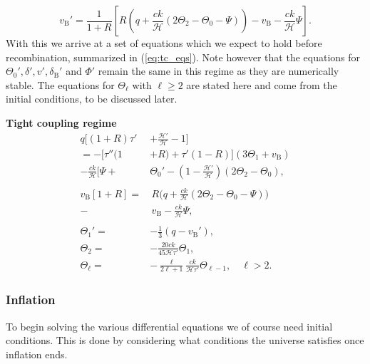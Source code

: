 \documentclass[%
reprint,
 amsmath,amssymb,
 aps,
]{revtex4-2}
\newcommand{\Hp}{\mathcal{H}}
\begin{document}
\[v_\text{B}'=\frac{1}{1+R}\left[R\left(q+\frac{ck}{\Hp}\left(2\Theta_2-\Theta_0-\Psi\right)\right)-v_\text{B}-\frac{ck}{\Hp}\Psi\right].\]
With this we arrive at a set of equations which we expect to hold before recombination, summarized in (\ref{eq:tc_eqs}). Note however that the equations for $\Theta_0',\delta',v',\delta_\text{B}'$ and $\Phi'$ remain the same in this regime as they are numerically stable. The equations for $\Theta_\ell$ with $\ell\geq2$ are stated here and come from the initial conditions, to be discussed later.
\begin{tcolorbox}[
	width=\linewidth,
	colback=black!3!white,
	]
	\textbf{Tight coupling regime}
	\begin{subequations}\label{eq:tc_eqs}
		\begin{align}
			q\biggl[(1+R)\tau'&+\frac{\Hp'}{\Hp}-1\biggr]\nonumber\\
			=-\bigl[\tau''(1&+R)+\tau'(1-R)\bigr](3\Theta_1+v_\text{B})\nonumber\\
			-\frac{ck}{\Hp}\biggl[\Psi+&\Theta_0'-\left(1-\frac{\Hp'}{\Hp}\right)(2\Theta_2-\Theta_0),\\
			\nonumber\\
			v_\text{B}[1+R]=&\,R\biggl(q+\frac{ck}{\Hp}\left(2\Theta_2-\Theta_0-\Psi\right)\biggr)\nonumber\\
			-&\,v_\text{B}-\frac{ck}{\Hp}\Psi,\\
			\nonumber\\
			\Theta_1'=&-\frac{1}{3}(q-v_\text{B}'),\\
			\Theta_2=&-\frac{20ck}{45\Hp\tau'}\Theta_1,\\
			\Theta_\ell=&-\frac{\ell}{2\ell+1}\frac{ck}{\Hp\tau'}\Theta_{\ell-1},\quad \ell>2.
		\end{align}
	\end{subequations}
\end{tcolorbox}



\subsubsection{Inflation}
To begin solving the various differential equations we of course need initial conditions. This is done by considering what conditions the universe satisfies once inflation ends. 
\end{document}
